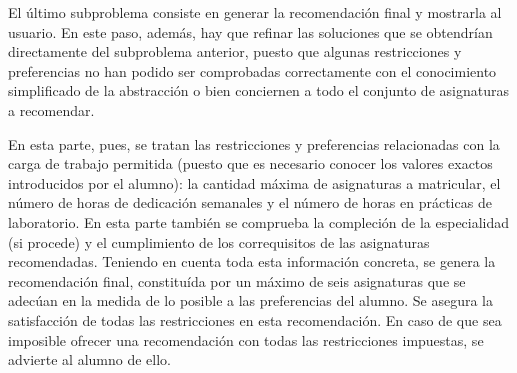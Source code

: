 El último subproblema consiste en generar la recomendación final y mostrarla 
al usuario. En este paso, además, hay que refinar las soluciones que se 
obtendrían directamente del subproblema anterior, puesto que algunas 
restricciones y preferencias no han podido ser comprobadas correctamente 
con el conocimiento simplificado de la abstracción o bien conciernen a todo 
el conjunto de asignaturas a recomendar. 

En esta parte, pues, se tratan las restricciones y preferencias relacionadas 
con la carga de trabajo permitida (puesto que es necesario conocer los valores 
exactos introducidos por el alumno): la cantidad máxima de asignaturas a 
matricular, el número de horas de dedicación semanales y el número de horas 
en prácticas de laboratorio. En esta parte también se comprueba la compleción 
de la especialidad (si procede) y el cumplimiento de los correquisitos de las 
asignaturas recomendadas. Teniendo en cuenta toda esta información concreta, 
se genera la recomendación final, constituída por un máximo de seis 
asignaturas que se adecúan en la medida de lo posible a las preferencias del 
alumno. Se asegura la satisfacción de todas las restricciones en esta 
recomendación. En caso de que sea imposible ofrecer una recomendación con 
todas las restricciones impuestas, se advierte al alumno de ello.




